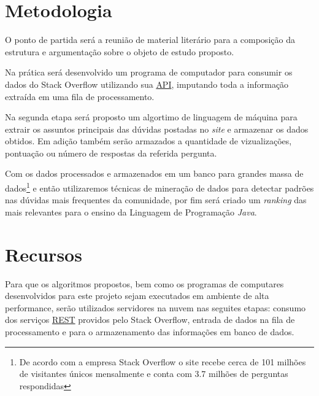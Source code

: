 
 
\chapter{Metodologia}\label{cap_exemplos}

O ponto de partida será a reunião de material literário para a composição da estrutura e argumentação sobre o objeto de estudo proposto.

Na prática será desenvolvido um programa de computador para consumir os dados do Stack Overflow utilizando sua \href{https://api.stackexchange.com/docs}{API}, imputando toda a informação extraída em uma fila de processamento.

Na segunda etapa será proposto um algortimo de linguagem de máquina para extrair os assuntos principais das dúvidas postadas no \textit{site} e armazenar os dados obtidos. Em adição também serão armazados a quantidade de vizualizações, pontuação ou número de respostas da referida pergunta.  

Com os dados processados e armazenados em um banco para grandes massa de dados\footnote{De acordo com a empresa Stack Overflow o site recebe cerca de 101 milhões de visitantes únicos mensalmente e conta com 3.7 milhões de perguntas respondidas} e então utilizaremos técnicas de mineração de dados para detectar padrões nas dúvidas mais frequentes da comunidade, por fim será criado um \textit{ranking} das mais relevantes para o ensino da Linguagem de Programação \emph{Java}. 

\chapter{Recursos}
Para que os algoritmos propostos, bem como os programas de computares desenvolvidos para este projeto sejam executados em ambiente de alta performance, serão utilizados servidores na nuvem nas seguites etapas: consumo dos serviços \href{https://www.ics.uci.edu/~fielding/pubs/dissertation/top.htm}{REST} providos pelo Stack Overflow, entrada de dados na fila de processamento e para o armazenamento das informações em banco de dados.

